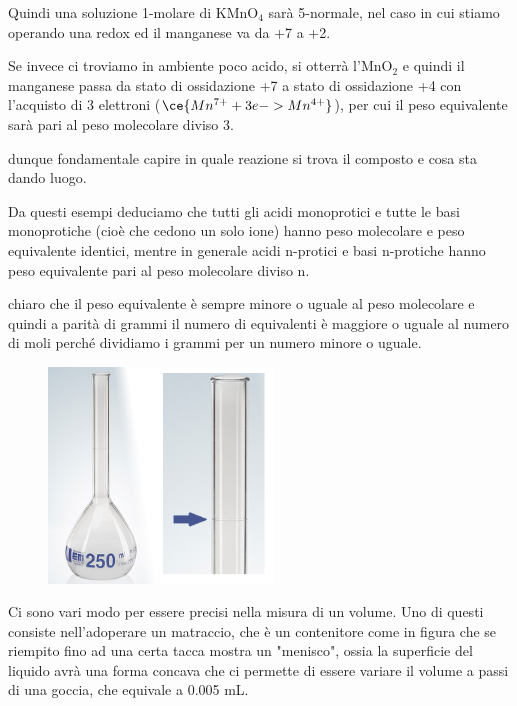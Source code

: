 \begin{enumerate}
    Quindi una soluzione 1-molare di KMnO$_4$ sarà 5-normale, nel caso in cui stiamo operando una redox ed il manganese va da +7 a +2. 
    
    \vspace{0.2cm}Se invece ci troviamo in ambiente poco acido, si otterrà l'MnO$_2$ e quindi il manganese passa da stato di ossidazione +7 a stato di ossidazione +4 con l'acquisto di 3 elettroni ($\ce{Mn^{7+} + 3e -> Mn^{4+}}$), per cui il peso equivalente sarà pari al peso molecolare diviso 3.

    \E dunque fondamentale capire in quale reazione si trova il composto e cosa sta dando luogo.
\end{enumerate}

Da questi esempi deduciamo che tutti gli acidi monoprotici e tutte le basi monoprotiche (cioè che cedono un solo ione) hanno peso molecolare e peso equivalente identici, mentre in generale acidi n-protici e basi n-protiche hanno peso equivalente pari al peso molecolare diviso n.

\E chiaro che il peso equivalente è sempre minore o uguale al peso molecolare e quindi a parità di grammi il numero di equivalenti è maggiore o uguale al numero di moli perché dividiamo i grammi per un numero minore o uguale.

\hspace{1cm}\begin{minipage}{0.42\textwidth}
    \begin{figure}[H]
        \includegraphics[width=6cm]{immagini/matraccio.png}
    \end{figure}
\end{minipage}
\begin{minipage}{0.5\textwidth}
    Ci sono vari modo per essere precisi nella misura di un volume. Uno di questi consiste nell'adoperare un matraccio, che è un contenitore come in figura che se riempito fino ad una certa tacca mostra un "menisco", ossia la superficie del liquido avrà una forma concava che ci permette di essere variare il volume a passi di una goccia, che equivale a 0.005 mL.
\end{minipage}


